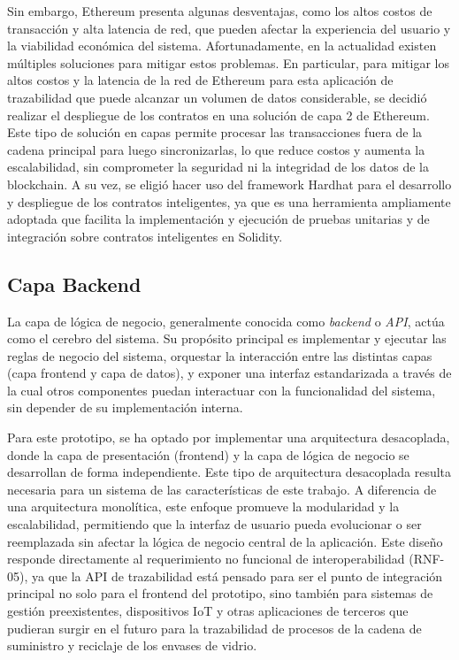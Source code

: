 Sin embargo, Ethereum presenta algunas desventajas, como los altos costos de transacción y alta latencia de red, que pueden afectar la experiencia del usuario y la viabilidad económica del sistema. Afortunadamente, en la actualidad existen múltiples soluciones para mitigar estos problemas. En particular, para mitigar los altos costos y la latencia de la red de Ethereum para esta aplicación de trazabilidad que puede alcanzar un volumen de datos considerable, se decidió realizar el despliegue de los contratos en una solución de capa 2 de Ethereum. Este tipo de solución en capas permite procesar las transacciones fuera de la cadena principal para luego sincronizarlas, lo que reduce costos y aumenta la escalabilidad, sin comprometer la seguridad ni la integridad de los datos de la blockchain. A su vez, se eligió hacer uso del framework Hardhat para el desarrollo y despliegue de los contratos inteligentes, ya que es una herramienta ampliamente adoptada que facilita la implementación y ejecución de pruebas unitarias y de integración sobre contratos inteligentes en Solidity.

\subsection{Capa Backend}

La capa de lógica de negocio, generalmente conocida como \textit{backend} o \textit{API}, actúa como el cerebro del sistema. Su propósito principal es implementar y ejecutar las reglas de negocio del sistema, orquestar la interacción entre las distintas capas (capa frontend y capa de datos), y exponer una interfaz estandarizada a través de la cual otros componentes puedan interactuar con la funcionalidad del sistema, sin depender de su implementación interna.

Para este prototipo, se ha optado por implementar una arquitectura desacoplada, donde la capa de presentación (frontend) y la capa de lógica de negocio se desarrollan de forma independiente. Este tipo de arquitectura desacoplada resulta necesaria para un sistema de las características de este trabajo. A diferencia de una arquitectura monolítica, este enfoque promueve la modularidad y la escalabilidad, permitiendo que la interfaz de usuario pueda evolucionar o ser reemplazada sin afectar la lógica de negocio central de la aplicación. Este diseño responde directamente al requerimiento no funcional de interoperabilidad (RNF-05), ya que la API de trazabilidad está pensado para ser el punto de integración principal no solo para el frontend del prototipo, sino también para sistemas de gestión preexistentes, dispositivos IoT y otras aplicaciones de terceros que pudieran surgir en el futuro para la trazabilidad de procesos de la cadena de suministro y reciclaje de los envases de vidrio.

